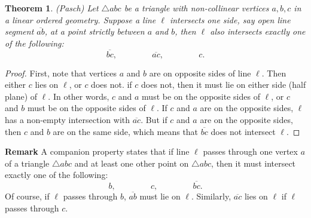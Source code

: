\documentclass[12pt]{article}
\newtheorem*{thm}{Theorem}
\begin{document}
\begin{thm}{(Pasch)}  Let $\triangle abc$ be a triangle with
non-collinear vertices $a,b,c$ in a {linear} ordered geometry.
Suppose a line $\ell$ intersects one side, say open line segment $\overline{ab}$, at a
point strictly between $a$ and $b$, then $\ell$ also intersects exactly one of the following:
$$\overline{bc}\mbox{, }\qquad\qquad\overline{ac}\mbox{, }\qquad\qquad c.$$
\end{thm}
\begin{proof}
First, note that vertices $a$ and $b$ are on opposite sides of line $\ell$.  Then either $c$ lies on $\ell$, or $c$ does not. if $c$ does not, then it must lie on either side (half plane) of $\ell$.  In other words, $c$ and $a$ must be on the opposite sides of $\ell$, or $c$ and $b$ must be on the opposite sides of $\ell$.
If $c$ and $a$ are on the opposite sides, $\ell$ has a non-empty intersection with $\overline{ac}$.  But if $c$ and $a$ are on the opposite sides, then $c$ and $b$ are on the same side, which means that $\overline{bc}$ does not intersect $\ell$.
\end{proof}
\textbf{Remark}
 A companion property states that if line $\ell$ passes through one vertex $a$ of a triangle $\triangle abc$ and at least one other point on $\triangle abc$, then it must intersect exactly one of the following:
$$b\mbox{, }\qquad\qquad c\mbox{, }\qquad\qquad\overline{bc}.$$
Of course, if $\ell$ passes through $b$, $\overline{ab}$ must lie on $\ell$.  Similarly, $\overline{ac}$ lies on $\ell$ if $\ell$ passes through $c$.
\end{document}
